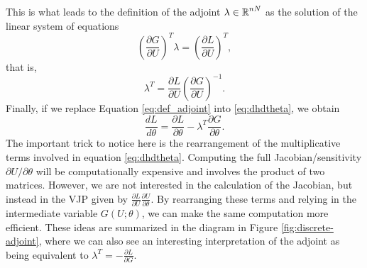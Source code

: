This is what leads to the definition of the adjoint $\lambda \in \operatorname{\mathbb{R}}^{nN}$ as the solution of the linear system of equations 
\begin{equation}
    \left( \frac{\partial G}{\partial U}\right)^T \lambda 
    =  
    \left( \frac{\partial L}{\partial U} \right)^T,
    \label{eq:adjoint-state-equation}
\end{equation}
that is,
\begin{equation}
    \lambda^T = \frac{\partial L}{\partial U} \left( \frac{\partial G}{\partial U} \right)^{-1}.
    \label{eq:def_adjoint}
\end{equation}
Finally, if we replace Equation \eqref{eq:def_adjoint} into \eqref{eq:dhdtheta}, we obtain 
\begin{equation}
    \frac{dL}{d\theta} 
    =
    \frac{\partial L}{\partial \theta} 
    - 
    \lambda^T \frac{\partial G}{\partial \theta}.
    \label{eq:gradient-adjoint-state-method}
\end{equation}
The important trick to notice here is the rearrangement of the multiplicative terms involved in equation \eqref{eq:dhdtheta}. 
Computing the full Jacobian/sensitivity $\partial U / \partial \theta$ will be computationally expensive and involves the product of two matrices. 
However, we are not interested in the calculation of the Jacobian, but instead in the VJP given by $\frac{\partial L}{\partial U} \frac{\partial U}{\partial \theta}$. 
By rearranging these terms and relying in the intermediate variable $G(U; \theta)$, we can make the same computation more efficient. 
These ideas are summarized in the diagram in Figure \ref{fig:discrete-adjoint}, where we can also see an interesting interpretation of the adjoint as being equivalent to $\lambda^T = - \frac{\partial L}{\partial G}$. 

